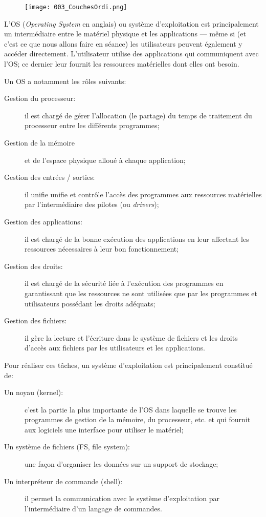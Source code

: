 \documentclass[12pt]{article}
\begin{document}
	\begin{figure}[H]
		\centering
		\texttt{[image: 003\_CouchesOrdi.png]}
	\end{figure}
	
	L'OS (\textit{Operating System} en anglais) ou système d'exploitation est principalement un intermédiaire entre le matériel physique et les applications --- même si (et c'est ce que nous allons faire en séance) les utilisateurs peuvent également y accéder directement. L'utilisateur utilise des applications qui communiquent avec l'OS; ce dernier leur fournit les ressources matérielles dont elles ont besoin.
	
	Un OS a notamment les rôles suivants:
	\begin{description}
		\item [Gestion du processeur:] il est chargé de gérer l'allocation (le partage) du temps de traitement du processeur entre les différents programmes;
		\item [Gestion de la mémoire] et de l'espace physique alloué à chaque application;
		\item [Gestion des entrées / sorties:] il unifie unifie et contrôle l'accès des programmes aux ressources matérielles par l'intermédiaire des pilotes (ou \textit{drivers});
		\item [Gestion des applications:] il est chargé de la bonne exécution des applications en leur affectant les ressources nécessaires à leur bon fonctionnement;
		\item [Gestion des droits:] il est chargé de la sécurité liée à l'exécution des programmes en garantissant que les ressources ne sont utilisées que par les programmes et utilisateurs possédant les droits adéquats;
		\item[Gestion des fichiers:] il gère la lecture et l'écriture dans le système de fichiers et les droits d'accès aux fichiers par les utilisateurs et les applications.
	\end{description}
	
	Pour réaliser ces tâches, un système d'exploitation est principalement constitué de:
	\begin{description}
		\item [Un noyau (kernel):] c'est la partie la plus importante de l'OS dans laquelle se trouve les programmes de gestion de la mémoire, du processeur, etc. et qui fournit aux logiciels une interface pour utiliser le matériel;
		\item [Un système de fichiers (FS, file system):] une façon d'organiser les données sur un support de stockage;
		\item[Un interpréteur de commande (shell):] il permet la communication avec le système d'exploitation par l'intermédiaire d'un langage de commandes.
	\end{description}
\end{document}
